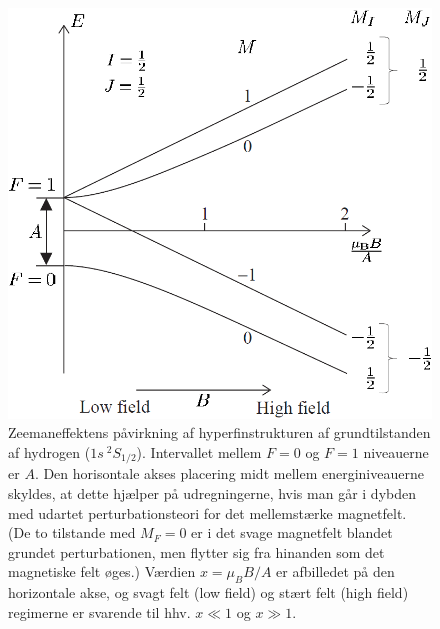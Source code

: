 \begin{figure}[!h]
    \centering
    \includegraphics[width=.7\textwidth]{Q17/images/ZeemanEffectHyperFineStructurHydrogenAllCases.PNG}
    \caption{Zeemaneffektens påvirkning af hyperfinstrukturen af grundtilstanden af hydrogen ($1s\:^2 S_{1/2}$). Intervallet mellem $F=0$ og $F=1$ niveauerne  er $A$. Den horisontale akses placering midt mellem energiniveauerne skyldes, at dette hjælper på udregningerne, hvis man går i dybden med udartet perturbationsteori for det mellemstærke magnetfelt. (De to tilstande med $M_F = 0$ er i det svage magnetfelt blandet grundet perturbationen, men flytter sig fra hinanden som det magnetiske felt øges.) Værdien $x = \mu_B B/A$ er afbilledet på den horizontale akse, og svagt felt (low field) og stært felt (high field) regimerne er svarende til hhv. $x \ll 1$ og $x \gg 1$.}
    \label{fig:Q17_AllCasesOfZeemanEffectInHyperFineStructure}
\end{figure}